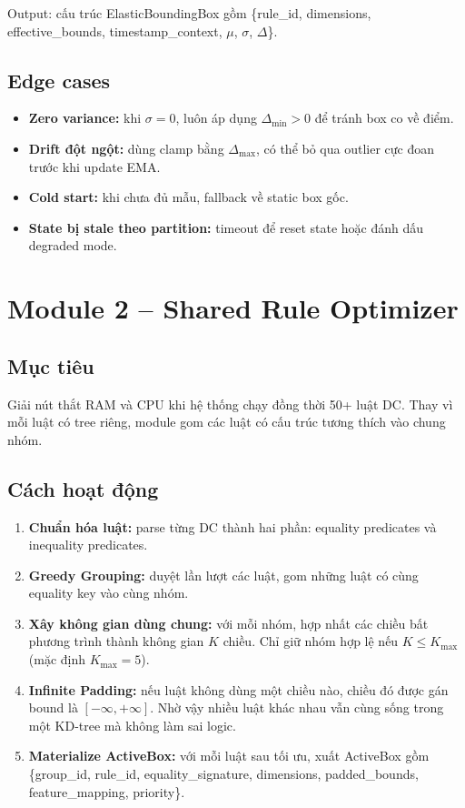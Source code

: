 Output: cấu trúc ElasticBoundingBox gồm \{rule\_id, dimensions, effective\_bounds, timestamp\_context, $\mu$, $\sigma$, $\Delta$\}.

\subsection{Edge cases}
\begin{itemize}
  \item \textbf{Zero variance:} khi $\sigma = 0$, luôn áp dụng $\Delta_{\min} > 0$ để tránh box co về điểm.
  \item \textbf{Drift đột ngột:} dùng clamp bằng $\Delta_{\max}$, có thể bỏ qua outlier cực đoan trước khi update EMA.
  \item \textbf{Cold start:} khi chưa đủ mẫu, fallback về static box gốc.
  \item \textbf{State bị stale theo partition:} timeout để reset state hoặc đánh dấu degraded mode.
\end{itemize}

\section{Module 2 -- Shared Rule Optimizer}

\subsection{Mục tiêu}
Giải nút thắt RAM và CPU khi hệ thống chạy đồng thời 50+ luật DC. Thay vì mỗi luật có tree riêng, module gom các luật có cấu trúc tương thích vào chung nhóm.

\subsection{Cách hoạt động}

\begin{enumerate}
  \item \textbf{Chuẩn hóa luật:} parse từng DC thành hai phần: equality predicates và inequality predicates.
  \item \textbf{Greedy Grouping:} duyệt lần lượt các luật, gom những luật có cùng equality key vào cùng nhóm.
  \item \textbf{Xây không gian dùng chung:} với mỗi nhóm, hợp nhất các chiều bất phương trình thành không gian $K$ chiều. Chỉ giữ nhóm hợp lệ nếu $K \leq K_{\max}$ (mặc định $K_{\max} = 5$).
  \item \textbf{Infinite Padding:} nếu luật không dùng một chiều nào, chiều đó được gán bound là $[-\infty, +\infty]$. Nhờ vậy nhiều luật khác nhau vẫn cùng sống trong một KD-tree mà không làm sai logic.
  \item \textbf{Materialize ActiveBox:} với mỗi luật sau tối ưu, xuất ActiveBox gồm \{group\_id, rule\_id, equality\_signature, dimensions, padded\_bounds, feature\_mapping, priority\}.
\end{enumerate}

